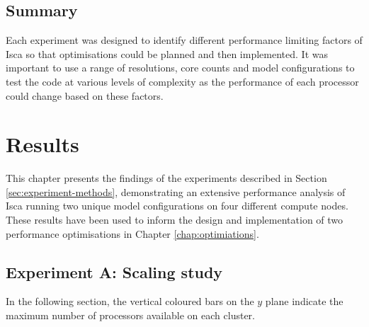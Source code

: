 \documentclass[a4paper,11pt]{report}
\begin{document}
\section{Summary}

Each experiment was designed to identify different performance limiting factors of Isca so that optimisations could be planned and then implemented. It was important to use a range of resolutions, core counts and model configurations to test the code at various levels of complexity as the performance of each processor could change based on these factors.

\chapter{Results}
\label{chap:results}
This chapter presents the findings of the experiments described in Section \ref{sec:experiment-methods}, demonstrating an extensive performance analysis of Isca running two unique model configurations on four different compute nodes. These results have been used to inform the design and implementation of two performance optimisations in Chapter \ref{chap:optimiations}. 
\section{Experiment A: Scaling study} 
In the following section, the vertical coloured bars on the $y$ plane indicate the maximum number of processors available on each cluster.
 
\end{document}
